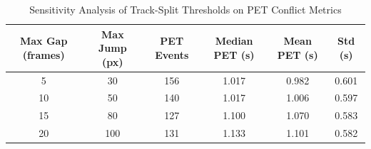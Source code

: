 \begin{table}[h]
\centering
\caption{Sensitivity Analysis of Track-Split Thresholds on PET Conflict Metrics}
\label{tab:sensitivity_pet}
\begin{tabular}{cccccc}
\hline
\textbf{Max Gap (frames)} & \textbf{Max Jump (px)} & \textbf{PET Events} & \textbf{Median PET (s)} & \textbf{Mean PET (s)} & \textbf{Std (s)} \\
\hline
5 & 30 & 156 & 1.017 & 0.982 & 0.601 \\
10 & 50 & 140 & 1.017 & 1.006 & 0.597 \\
15 & 80 & 127 & 1.100 & 1.070 & 0.583 \\
20 & 100 & 131 & 1.133 & 1.101 & 0.582 \\
\hline
\end{tabular}
\end{table}